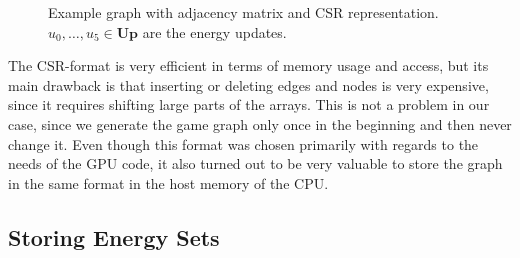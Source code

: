 \begin{figure}[ht]
\begin{center}
\end{center}
\caption{Example graph with adjacency matrix and CSR representation.
    $u_0, \ldots, u_5 \in \mathbf{Up}$ are the energy updates.
}%
\label{fig:csr}
\end{figure}

The CSR-format is very efficient in terms of memory usage and access,
but its main drawback is that inserting or deleting edges and nodes is very
expensive, since it requires shifting large parts of the arrays.
This is not a problem in our case, since we generate the game graph only once
in the beginning and then never change it.
Even though this format was chosen primarily with regards to the needs
of the GPU code, it also turned out to be very valuable to store the graph in
the same format in the host memory of the CPU\@.


\subsection{Storing Energy Sets}\label{subsec:energy_memory}

